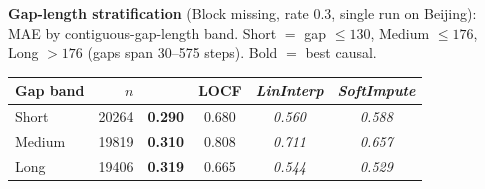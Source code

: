 \begin{table}[tbp]
{\textbf{Gap-length stratification} (Block missing, rate 0.3, single run on Beijing): MAE by contiguous-gap-length band. Short $=$ gap $\le 130$, Medium $\le 176$, Long $>176$ (gaps span 30--575 steps). Bold $=$ best causal.\par}
\begin{tabular}{@{}lrcccc@{}}
\toprule
Gap band & $n$ & \cafe{} & LOCF & \textit{LinInterp} & \textit{SoftImpute} \\
\midrule
Short & 20264 & \textbf{0.290} & 0.680 & \textit{0.560} & \textit{0.588} \\
Medium & 19819 & \textbf{0.310} & 0.808 & \textit{0.711} & \textit{0.657} \\
Long & 19406 & \textbf{0.319} & 0.665 & \textit{0.544} & \textit{0.529} \\
\bottomrule
\end{tabular}
\end{table}

